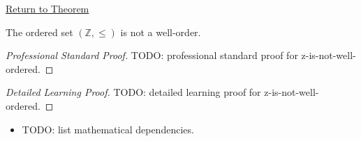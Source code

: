 \newpage
{}
\label{prf:z-is-not-well-ordered}

\begin{remark*}[Return]
\hyperref[thm:z-is-not-well-ordered]{Return to Theorem}
\end{remark*}

\begin{theorem*}
The ordered set $(\mathbb{Z},\le)$ is not a well-order.
\end{theorem*}

\begin{proof}[Professional Standard Proof]
\LRAProofBodyStart
TODO: professional standard proof for z-is-not-well-ordered.
\end{proof}

\begin{proof}[Detailed Learning Proof]
\LRAProofBodyStart
TODO: detailed learning proof for z-is-not-well-ordered.
\end{proof}

\begin{remark*}
\end{remark*}

\begin{dependencies}
\begin{itemize}
  \item TODO: list mathematical dependencies.
\end{itemize}
\end{dependencies}

\clearpage
